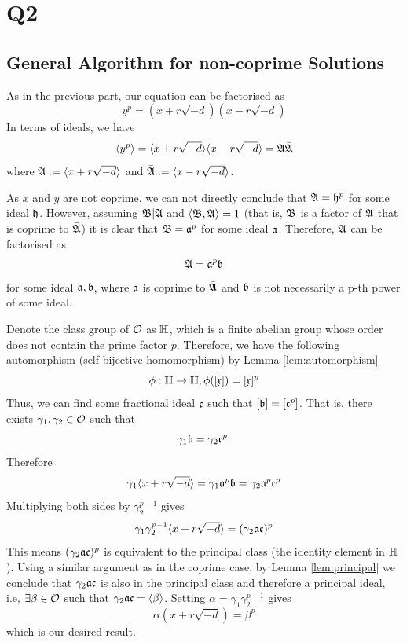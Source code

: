 \section{Q2}

\subsection{General Algorithm for non-coprime Solutions}

As in the previous part, our equation can be factorised as 
$$
	y^p = (x + r\sqrt{-d})(x - r\sqrt{-d})
$$
In terms of ideals, we have
$$
	\langle y^p \rangle = \langle x + r\sqrt{-d} \rangle \langle x - r\sqrt{-d} \rangle 
	= \mathfrak{A} \bar{\mathfrak{A}}
$$
where $\mathfrak{A} := \langle x + r\sqrt{-d} \rangle$ and $\bar{\mathfrak{A}} := \langle x - r\sqrt{-d} \rangle$.

As $x$ and $y$ are not coprime, we can not directly conclude that $\mathfrak{A} = \mathfrak{h}^p$ for some ideal $\mathfrak{h}$. 
However, assuming $\mathfrak{B} | \mathfrak{A}$ and $\langle \mathfrak{B}, \bar{\mathfrak{A}} \rangle = 1$ (that is, $\mathfrak{B}$ is a factor of $\mathfrak{A}$ that is coprime to $\bar{\mathfrak{A}}$) it is clear that $\mathfrak{B} = \mathfrak{a}^p$ for some ideal $\mathfrak{a}$.
Therefore, $\mathfrak{A}$ can be factorised as 
\begin{equation}\label{eq:A-factor}
	\mathfrak{A} = \mathfrak{a}^p \mathfrak{b}
\end{equation}
for some ideal $\mathfrak{a}, \mathfrak{b}$, where $\mathfrak{a}$ is coprime to $\bar{\mathfrak{A}}$ and $\mathfrak{b}$ is not necessarily a p-th power of some ideal.

Denote the class group of $\mathcal{O}$ as $\mathbb{H}$, which is a finite abelian group whose order does not contain the prime factor $p$.
Therefore, we have the following automorphism (self-bijective homomorphism) by Lemma \ref{lem:automorphism}
$$
\phi: \mathbb{H} \rightarrow \mathbb{H},	\phi([\mathfrak{x}]) = [\mathfrak{x}]^p
$$
Thus, we can find some fractional ideal $\mathfrak{c}$ such that $[\mathfrak{b}] = [\mathfrak{c}^p]$.
That is, there exists $\gamma_1, \gamma_2 \in \mathcal{O}$ such that 
$$
	\gamma_1 \mathfrak{b} = \gamma_2 \mathfrak{c}^p .
$$
Therefore 
$$
\gamma_1 \langle x + r\sqrt{-d} \rangle = \gamma_1 \mathfrak{a}^p\mathfrak{b} = \gamma_2 \mathfrak{a}^p \mathfrak{c}^p$$
Multiplying both sides by $\gamma_2^{p-1}$ gives
$$ 
\gamma_1 \gamma_2^{p-1} \langle x +  r \sqrt{-d} \rangle  = (\gamma_2 \mathfrak{a}\mathfrak{c} )^p 
$$
This means $(\gamma_2\mathfrak{a}\mathfrak{c})^p$ is equivalent to the principal class (the identity element in $\mathbb{H}$).
Using a similar argument as in the coprime case, by Lemma \ref{lem:principal} we conclude that $\gamma_2\mathfrak{a}\mathfrak{c}$ is also in the principal class and therefore a principal ideal, i.e, $\exists \beta\in \mathcal{O}$ such that $\gamma_2 \mathfrak{a}\mathfrak{c} = \langle \beta \rangle$.
Setting $\alpha = \gamma_1 \gamma_2^{p-1}$ gives
\begin{equation}
	\alpha  (x + r\sqrt{-d}) = \beta^p
\end{equation}
which is our desired result.

